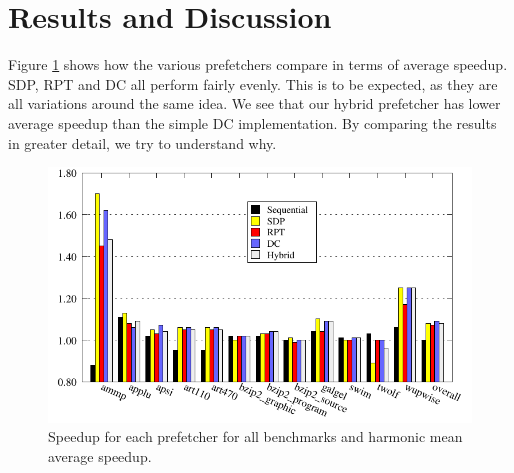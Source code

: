 \section{Results and Discussion}
\label{sec:results-and-discussion}

Figure \ref{fig:comparison} shows how the various prefetchers compare in terms of average speedup.
SDP, RPT and DC all perform fairly evenly.
This is to be expected, as they are all variations around the same idea.
We see that our hybrid prefetcher has lower average speedup than the simple DC implementation.
By comparing the results in greater detail, we try to understand why.

\begin{figure}
  \centering
  \includegraphics{plots/overview_speedup.pdf}
  \caption{Speedup for each prefetcher for all benchmarks and harmonic mean average speedup.}
  \label{fig:comparison}
\end{figure}


